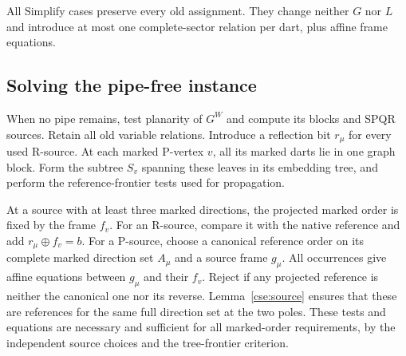 All Simplify cases preserve every old assignment. They change neither
$G$ nor $L$ and introduce at most one complete-sector relation per dart,
plus affine frame equations.

\subsection{Solving the pipe-free instance}

When no pipe remains, test planarity of $G^W$ and compute its blocks and
SPQR sources. Retain all old variable relations. Introduce a reflection
bit $r_\mu$ for every used R-source. At each marked P-vertex $v$, all its
marked darts lie in one graph block. Form the subtree $S_v$ spanning
these leaves in its embedding tree, and perform the reference-frontier
tests used for propagation.

At a source with at least three marked directions, the projected marked
order is fixed by the frame $f_v$. For an R-source, compare it with the
native reference and add $r_\mu\oplus f_v=b$. For a P-source, choose a
canonical reference order on its complete marked direction set $A_\mu$
and a source frame $g_\mu$. All occurrences give affine equations between
$g_\mu$ and their $f_v$. Reject if any projected reference is neither the
canonical one nor its reverse. Lemma~\ref{cse:source} ensures that these
are references for the same full direction set at the two poles. These
tests and equations are necessary and sufficient for all marked-order
requirements, by the independent source choices and the tree-frontier
criterion.

